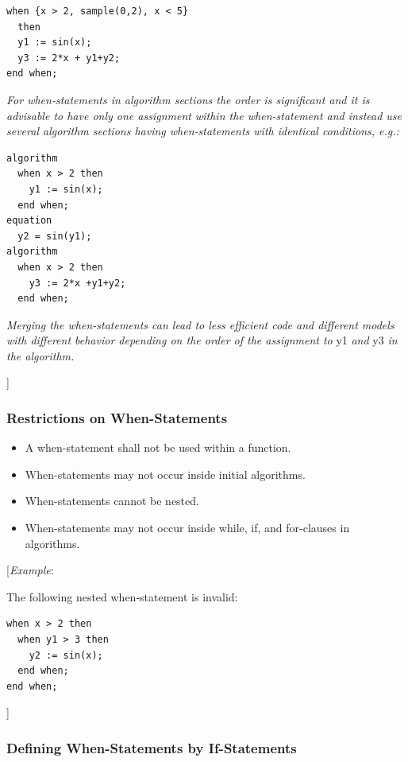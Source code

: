 \documentclass[10pt,a4paper]{report}
\def\doublelabel#1{\label{#1}\hypertarget{#1}{}}
\begin{document}
\begin{lstlisting}[language=modelica]
when {x > 2, sample(0,2), x < 5}
  then
  y1 := sin(x);
  y3 := 2*x + y1+y2;
end when;
\end{lstlisting}
\emph{For when-statements in algorithm sections the order is significant
and it is advisable to have only one assignment within the
when-statement and instead use several algorithm sections having
when-statements with identical conditions, e.g.:}

\begin{lstlisting}[language=modelica]
algorithm
  when x > 2 then
    y1 := sin(x);
  end when;
equation
  y2 = sin(y1);
algorithm
  when x > 2 then
    y3 := 2*x +y1+y2;
  end when;
\end{lstlisting}
\emph{Merging the when-statements can lead to less efficient code and
different models with different behavior depending on the order of the
assignment to} y1 \emph{and} y3 \emph{in the algorithm.}

{]}

\subsubsection{Restrictions on When-Statements}\doublelabel{restrictions-on-when-statements}

\begin{itemize}
\item
  A when-statement shall not be used within a function.
\item
  When-statements may not occur inside initial algorithms.
\item
  When-statements cannot be nested.
\item
  When-statements may not occur inside while, if, and for-clauses in
  algorithms.
\end{itemize}

{[}\emph{Example}:

The following nested when-statement is invalid:

\begin{lstlisting}[language=modelica]
when x > 2 then
  when y1 > 3 then
    y2 := sin(x);
  end when;
end when;
\end{lstlisting}
{]}

\subsubsection{Defining When-Statements by If-Statements}\doublelabel{defining-when-statements-by-if-statements}
\end{document}
